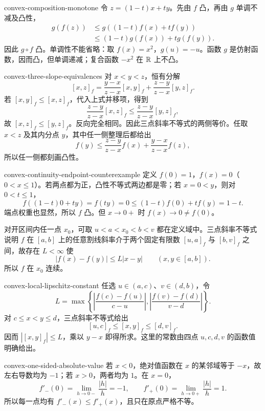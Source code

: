 \begin{solution}{convex-composition-monotone}
令 \(z=(1-t)x+ty\)。先由 \(f\) 凸，再由 \(g\) 单调不减及凸性，
\[
 \begin{aligned}
 g(f(z))
 &\le g((1-t)f(x)+tf(y))\\
 &\le(1-t)g(f(x))+tg(f(y)).
 \end{aligned}
\]
因此 \(g\circ f\) 凸。单调性不能省略：取 \(f(x)=x^2\)，\(g(u)=-u\)。函数 \(g\) 是仿射函数，因而凸，但单调递减；复合函数 \(-x^2\) 在 \(\mathbb{R}\) 上不凸。
\end{solution}

\begin{solution}{convex-three-slope-equivalences}
对 \(x<y<z\)，恒有分解
\[
 [x,z]_f=\frac{y-x}{z-x}[x,y]_f+
          \frac{z-y}{z-x}[y,z]_f.
\]
若 \([x,y]_f\le[x,z]_f\)，代入上式并移项，得到
\[
 \frac{z-y}{z-x}[x,z]_f
 \le\frac{z-y}{z-x}[y,z]_f,
\]
故 \([x,z]_f\le[y,z]_f\)。反向完全相同。因此三点斜率不等式的两侧等价。任取 \(x<z\) 及其内分点 \(y\)，其中任一侧整理后都给出
\[
 f(y)\le\frac{z-y}{z-x}f(x)+\frac{y-x}{z-x}f(z),
\]
所以任一侧都刻画凸性。
\end{solution}

\begin{solution}{convex-continuity-endpoint-counterexample}
定义 \(f(0)=1\)，\(f(x)=0\)（\(0<x\le1\)）。若两点都为正，凸性不等式两边都是零；若 \(x=0<y\)，则对 \(0<t\le1\)，
\[
 f((1-t)0+ty)=f(ty)=0\le(1-t)f(0)+tf(y)=1-t.
\]
端点权重也显然，所以 \(f\) 凸。但 \(x\to0+\) 时 \(f(x)\to0\ne f(0)\)。

对开区间内任一点 \(x_0\)，可取 \(u<a<x_0<b<v\) 都在定义域中。三点斜率不等式说明 \(f\) 在 \([a,b]\) 上的任意割线斜率介于两个固定有限数 \([u,a]_f\) 与 \([b,v]_f\) 之间，故存在 \(L<\infty\) 使
\[
 |f(x)-f(y)|\le L|x-y|\qquad(x,y\in[a,b]).
\]
所以 \(f\) 在 \(x_0\) 连续。
\end{solution}

\begin{solution}{convex-local-lipschitz-constant}
任选 \(u\in(a,c)\)、\(v\in(d,b)\)，令
\[
 L=\max\left\{
 \left|\frac{f(c)-f(u)}{c-u}\right|,
 \left|\frac{f(v)-f(d)}{v-d}\right|
 \right\}.
\]
对 \(c\le x<y\le d\)，三点斜率不等式给出
\[
 [u,c]_f\le[x,y]_f\le[d,v]_f.
\]
因而 \(|[x,y]_f|\le L\)，乘以 \(y-x\) 即得所求。这里的常数由四点 \(u,c,d,v\) 的函数值明确给出。
\end{solution}

\begin{solution}{convex-one-sided-absolute-value}
若 \(x<0\)，绝对值函数在 \(x\) 的某邻域等于 \(-x\)，故左右导数均为 \(-1\)；若 \(x>0\)，两者均为 \(1\)。在 \(x=0\)，
\[
 f'_-(0)=\lim_{h\to0-}\frac{|h|}{h}=-1,
 \qquad
 f'_+(0)=\lim_{h\to0+}\frac{|h|}{h}=1.
\]
所以每一点均有 \(f'_-(x)\le f'_+(x)\)，且只在原点严格不等。
\end{solution}

